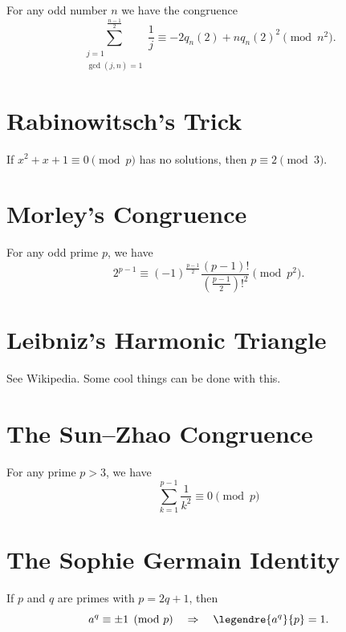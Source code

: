 \begin{theorem}
  For any odd number $n$ we have the congruence
  \begin{equation*}
    \sum_{\substack{j=1\\ \gcd(j,n)=1}}^{\frac{n-1}{2}}\frac{1}{j}\equiv -2 q_n(2)+ nq_n(2)^2\pmod{n^2}.
  \end{equation*}
\end{theorem}

\section{Rabinowitsch's Trick}

If $x^2+x+1\equiv 0\pmod{p}$ has no solutions, then $p\equiv 2\pmod{3}$.

\section{Morley's Congruence}

For any odd prime $p$, we have
\begin{equation*}
  2^{p-1}\equiv (-1)^{\frac{p-1}{2}}\frac{(p-1)!}{\left(\frac{p-1}{2}\right)!^2} \pmod{p^2}.
\end{equation*}

\section{Leibniz's Harmonic Triangle}

See Wikipedia. Some cool things can be done with this.

\section{The Sun--Zhao Congruence}

For any prime $p>3$, we have
\begin{equation*}
  \sum_{k=1}^{p-1}\frac{1}{k^2}\equiv 0\pmod{p}
\end{equation*}

\section{The Sophie Germain Identity}

If $p$ and $q$ are primes with $p=2q+1$, then
\begin{equation*}
  a^q\equiv\pm 1\pmod{p}\quad\Rightarrow\quad \legendre{a^q}{p}=1.
\end{equation*}

